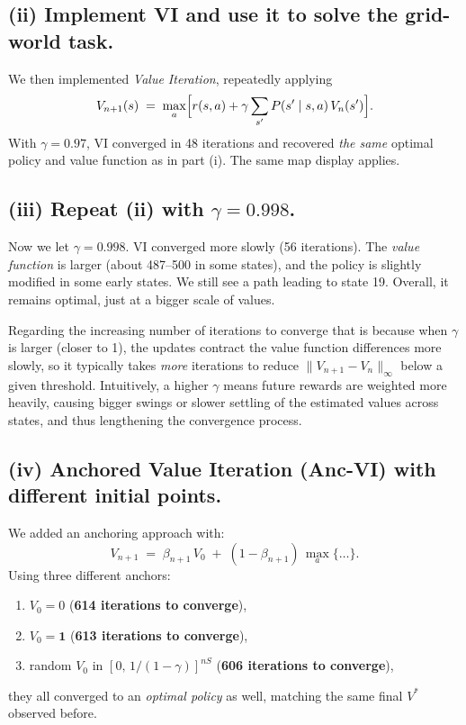 \subsection*{(ii) Implement VI and use it to solve the grid-world task.}

\noindent
We then implemented \emph{Value Iteration}, repeatedly applying
\[
  V_{n+1}(s) 
   \;=\;\max_{a}\Bigl[r(s,a) + \gamma\sum_{s'}P(s'\mid s,a)\,V_{n}(s')\Bigr].
\]
With \(\gamma=0.97\), VI converged in 48 iterations and recovered \emph{the same} 
optimal policy and value function as in part (i). The same map display applies.

\subsection*{(iii) Repeat (ii) with \(\gamma=0.998\).}

\noindent
Now we let \(\gamma=0.998\).  VI converged more slowly (56 iterations). 
The \emph{value function} is larger (about 487--500 in some states), 
and the policy is slightly modified in some early states.  
We still see a path leading to state 19. 
Overall, it remains optimal, just at a bigger scale of values.

Regarding the increasing number of iterations to converge that is because when \(\gamma\) is larger (closer to 1), the updates contract the value function differences more slowly, so it typically takes \emph{more} iterations to reduce \( \|V_{n+1} - V_n\|_{\infty} \) below a given threshold. Intuitively, a higher \(\gamma\) means future rewards are weighted more heavily, causing bigger swings or slower settling of the estimated values across states, and thus lengthening the convergence process.


\subsection*{(iv) Anchored Value Iteration (Anc-VI) with different initial points.}

\noindent
We added an anchoring approach with:
\[
  V_{n+1} 
   \;=\;\beta_{n+1}\,V_0 \;+\;(1-\beta_{n+1})\,\max_{a}\{\dots\}.
\]
Using three different anchors:
\begin{enumerate}[label=(\alph*)]
\item $V_0=0$ \quad(\textbf{614 iterations to converge}),
\item $V_0= \mathbf{1}$ \quad(\textbf{613 iterations to converge}),
\item random $V_0$ in $[0,\,1/(1-\gamma)]^{nS}$ \quad(\textbf{606 iterations to converge}),
\end{enumerate}
they all converged to an \emph{optimal policy} as well, matching the same final $V^*$ observed before.  

